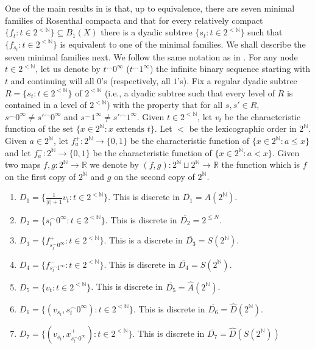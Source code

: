 \documentclass[psamsfonts]{amsart}
\theoremstyle{definition}
\theoremstyle{remark}
\numberwithin{equation}{section}
\begin{document}
One of the main results in \cite{argyros2008rosenthal} is that, up to equivalence,  there are  seven minimal families of Rosenthal compacta and that for every relatively compact $\{f_t:t\in 2^{<\mathbb{N}}\}\subseteq B_1(X)$ there is a dyadic subtree $\{s_t:t\in 2^{<\mathbb{N}}\}$ such that $\{f_{s_t}:t\in 2^{<\mathbb{N}}\}$ is equivalent to one of the minimal families.
We shall describe the seven minimal families next.
We follow the same notation as in \cite{argyros2008rosenthal}.
For any node $t\in 2^{<\mathbb{N}}$, let us denote by $t^\frown 0^{\infty}$ ($t^\frown 1^{\infty}$) the infinite binary sequence starting with $t$ and continuing will all $0$'s (respectively, all $1$'s).
Fix a regular dyadic subtree $R=\{s_t:t\in 2^{<\mathbb{N}}\}$ of $2^{<\mathbb{N}}$ (i.e., a dyadic subtree such that every level of $R$ is contained in a level of $2^{<\mathbb{N}}$) with the property that for all $s,s'\in R$, $s^\frown 0^{\infty}\neq s'^\frown 0^\infty$ and $s^\frown 1^{\infty}\neq s'^\frown 1^\infty$.
Given $t\in 2^{<\mathbb{N}}$, let $v_t$ be the characteristic function of the set $\{x\in 2^\mathbb{N}:x \text{ extends } t\}$.
Let $<$ be the lexicographic order in $2^\mathbb{N}$.
Given $a\in 2^{\mathbb{N}}$, let $f^+_a:2^{\mathbb{N}}\rightarrow\{0,1\}$ be the characteristic function of $\{x\in 2^{\mathbb{N}}:a\leq x\}$ and let $f^-_a:2^{\mathbb{N}}\rightarrow\{0,1\}$ be the characteristic function of $\{x\in 2^{\mathbb{N}}:a<x\}$.
Given two maps $f,g:2^{\mathbb{N}}\rightarrow\mathbb{R}$ we denote by $(f,g):2^{\mathbb{N}}\sqcup 2^{\mathbb{N}}\rightarrow\mathbb{R}$ the function which is $f$ on the first copy of $2^{\mathbb{N}}$ and $g$ on the second copy of $2^{\mathbb{N}}$.

\begin{enumerate}
    \item $D_1=\{\frac{1}{|t|+1}v_t:t\in 2^{<\mathbb{N}}\}$.
This is discrete in $\overline{D_1}=A(2^{\mathbb{N}})$.

    \item $D_2=\{s_t^\frown 0^{\infty}:t\in 2^{<\mathbb{N}}\}$.
This is discrete in $\overline{D_2}=2^{\leq N}$.
    \item $D_3=\{f^+_{s_t^\frown 0^\infty}:t\in 2^{<\mathbb{N}}\}$.
This is a discrete in $\overline{D_3}=S(2^{\mathbb{N}})$.
    \item $D_4=\{f^-_{s_t^\frown 1^\infty}:t\in 2^{<\mathbb{N}}\}$.
This is discrete in $\overline{D_4}=S(2^{\mathbb{N}})$.
    \item $D_5=\{v_t:t\in 2^{<\mathbb{N}}\}$.
This is discrete in $\overline{D_5}=\hat{A}(2^{\mathbb{N}})$.
    \item $D_6=\{(v_{s_t},s_t^\frown 0^\infty):t\in 2^{<\mathbb{N}}\}$.
This is discrete in $\overline{D_6}=\hat{D}(2^{\mathbb{N}})$.
    \item $D_7=\{(v_{s_t},x^+_{s_t^\frown 0^\infty}):t\in 2^{<\mathbb{N}}\}$.
This is discrete in $\overline{D_7}=\hat{D}(S(2^{\mathbb{N}}))$
\end{enumerate}
\end{document}
